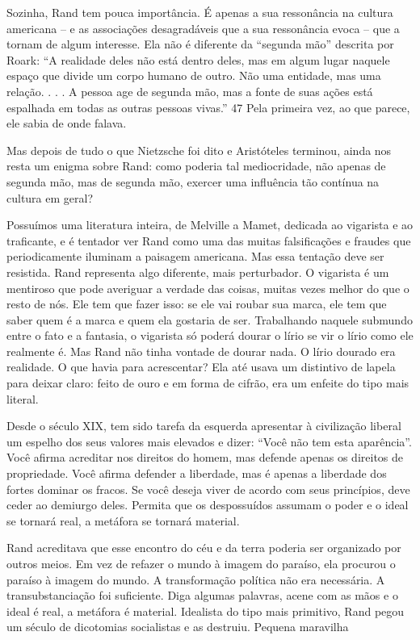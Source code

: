  \par 
Sozinha, Rand tem pouca importância. É apenas a sua ressonância na cultura americana – e as associações desagradáveis ​​que a sua ressonância evoca – que a tornam de algum interesse. Ela não é diferente da “segunda mão” descrita por Roark: “A realidade deles não está dentro deles, mas em algum lugar naquele espaço que divide um corpo humano de outro. Não uma entidade, mas uma relação. . . . A pessoa age de segunda mão, mas a fonte de suas ações está espalhada em todas as outras pessoas vivas.” {\color{blue}47} Pela primeira vez, ao que parece, ele sabia de onde falava.
 \par 
Mas depois de tudo o que Nietzsche foi dito e Aristóteles terminou, ainda nos resta um enigma sobre Rand: como poderia tal mediocridade, não apenas de segunda mão, mas de segunda mão, exercer uma influência tão contínua na cultura em geral?
 \par 
Possuímos uma literatura inteira, de Melville a Mamet, dedicada ao vigarista e ao traficante, e é tentador ver Rand como uma das muitas falsificações e fraudes que periodicamente iluminam a paisagem americana. Mas essa tentação deve ser resistida. Rand representa algo diferente, mais perturbador. O vigarista é um mentiroso que pode averiguar a verdade das coisas, muitas vezes melhor do que o resto de nós. Ele tem que fazer isso: se ele vai roubar sua marca, ele tem que saber quem é a marca e quem ela gostaria de ser. Trabalhando naquele submundo entre o fato e a fantasia, o vigarista só poderá dourar o lírio se vir o lírio como ele realmente é. Mas Rand não tinha vontade de dourar nada. O lírio dourado era realidade. O que havia para acrescentar? Ela até usava um distintivo de lapela para deixar claro: feito de ouro e em forma de cifrão, era um enfeite do tipo mais literal.
 \par 
Desde o século XIX, tem sido tarefa da esquerda apresentar à civilização liberal um espelho dos seus valores mais elevados e dizer: “Você não tem esta aparência”. Você afirma acreditar nos direitos do homem, mas defende apenas os direitos de propriedade. Você afirma defender a liberdade, mas é apenas a liberdade dos fortes dominar os fracos. Se você deseja viver de acordo com seus princípios, deve ceder ao demiurgo deles. Permita que os despossuídos assumam o poder e o ideal se tornará real, a metáfora se tornará material.
 \par 
Rand acreditava que esse encontro do céu e da terra poderia ser organizado por outros meios. Em vez de refazer o mundo à imagem do paraíso, ela procurou o paraíso à imagem do mundo. A transformação política não era necessária. A transubstanciação foi suficiente. Diga algumas palavras, acene com as mãos e o ideal é real, a metáfora é material. Idealista do tipo mais primitivo, Rand pegou um século de dicotomias socialistas e as destruiu. Pequena maravilha
